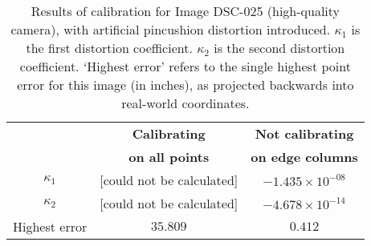 \begin{table}[htbp]
  \centering
  \begin{tabular}{c c c}
    \toprule
    \textbf{ } & \textbf{Calibrating} & \textbf{Not calibrating}\\
    \textbf{ } & \textbf{on all points} & \textbf{on edge columns}\\
    \midrule
    $\kappa_{1}$ & [could not be calculated] & $-1.435 \times 10^{-08}$\\
    $\kappa_{2}$ & [could not be calculated] & $-4.678 \times 10^{-14}$\\
    Highest error & $35.809$ & $0.412$\\
    \bottomrule
  \end{tabular}
  \caption[Results of calibration for Image DSC-025 (high-quality camera) with pincushion distortion]{Results of calibration for Image DSC-025 (high-quality camera), with artificial pincushion distortion introduced. $\kappa_{1}$ is the first distortion coefficient. $\kappa_{2}$ is the second distortion coefficient. `Highest error' refers to the single highest point error for this image (in inches), as projected backwards into real-world coordinates.}
  \label{tbl:calibration-stats-dsc-3}
\end{table}
